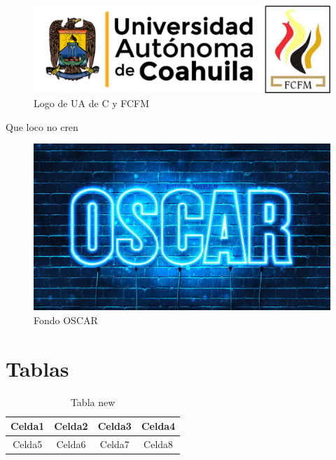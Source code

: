 \documentclass[12pt, letterpaper]{article} %
\begin{document}
		\begin{figure}[!]
			\centering %
			\includegraphics[width=\linewidth]{Nom_UAdeC_FCFM.png} %
			\caption{Logo de UA de C y FCFM} %
			\label{fig:LOGO} %
		
		\end{figure}
		
		Que loco no cren

		\begin{figure}
			\centering %
			\includegraphics[width=.5\linewidth]{OSCAR F.jpg} 
			\caption{Fondo OSCAR} %
			\label{fig:OSCAR} %
		
		\end{figure}
		
	\section{Tablas}\label{sec:Tablas}

	\begin{table}[h!]%
		\centering
		\begin{tabular}{|cc|c||c|} %
		
			\hline
			Celda1 & Celda2 & Celda3 & Celda4 \\\hline
			Celda5 & Celda6 & Celda7 & Celda8 \\\hline
			\hline
			\hline
			
		\end{tabular}
		\caption{Tabla new}
		\label{tab:1}

	\end{table}
	
\end{document}
